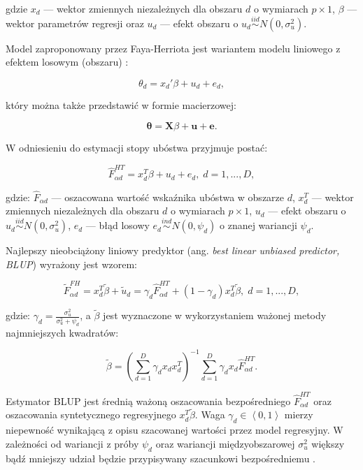 gdzie $x_d$ --- wektor zmiennych niezależnych dla obszaru $d$ o wymiarach $p \times 1$, $\beta$ --- wektor parametrów regresji oraz $u_d$ --- efekt obszaru o $u_d\stackrel{iid}{\sim}N(0,\sigma^2_u)$.

Model zaproponowany przez Faya-Herriota jest wariantem modelu liniowego z efektem losowym (obszaru) \citep{fratczak2012}:

\begin{equation}
\theta_d=x_d'\beta+u_d+e_d,
\end{equation}

który można także przedstawić w formie macierzowej:

\begin{equation}
\mathbf{\theta}=\mathbf{X}\beta+\mathbf{u}+\mathbf{e}.
\end{equation}

W odniesieniu do estymacji stopy ubóstwa przyjmuje postać:

\begin{equation}
\hat{F}_{\alpha d}^{HT}=x_d^{T}\beta + u_d + e_d,\; d=1, ..., D,
\end{equation}

gdzie: $\hat{F}_{\alpha d}$ --- oszacowana wartość wskaźnika ubóstwa w obszarze $d$, $x_d^{T}$ --- wektor zmiennych niezależnych dla obszaru $d$ o wymiarach $p \times 1$, $u_d$ --- efekt obszaru o $u_d\stackrel{iid}{\sim}N(0,\sigma^2_u)$, $e_d$ --- błąd losowy $e_d\stackrel{ind}{\sim}N(0,\psi_d)$ o znanej wariancji $\psi_d$.

Najlepszy nieobciążony liniowy predyktor (ang. \textit{best linear unbiased predictor, BLUP}) wyrażony jest wzorem:

\begin{equation}
\tilde{F}_{\alpha d}^{FH}=x_d^{T}\tilde{\beta} + \tilde{u}_d = \gamma_d\hat{F}_{\alpha d}^{HT} + (1-\gamma_d)x_d^{T}\tilde{\beta},\; d=1, ..., D,
\end{equation}

gdzie: $\gamma_d=\frac{\sigma^2_u}{\sigma^2_u+\psi_d}$, a $\tilde{\beta}$ jest wyznaczone w wykorzystaniem ważonej metody najmniejszych kwadratów:

\begin{equation}
\tilde{\beta}=\left(\sum\limits_{d=1}^{D}{\gamma_d x_d x_d^T}\right)^{-1}\sum\limits_{d=1}^{D}{\gamma_d x_d \hat{F}_{\alpha d}^{HT}}.
\end{equation}

Estymator BLUP jest średnią ważoną oszacowania bezpośredniego $\hat{F}_{\alpha d}^{HT}$ oraz oszacowania syntetycznego regresyjnego $x_d^{T}\tilde{\beta}$. Waga $\gamma_d \in \left\langle 0,1\right\rangle$ mierzy niepewność wynikającą z opisu szacowanej wartości przez model regresyjny. W zależności od wariancji z próby $\psi_d$ oraz wariancji międzyobszarowej $\sigma_u^2$ większy bądź mniejszy udział będzie przypisywany szacunkowi bezpośredniemu \citep{boonstra2011}.

